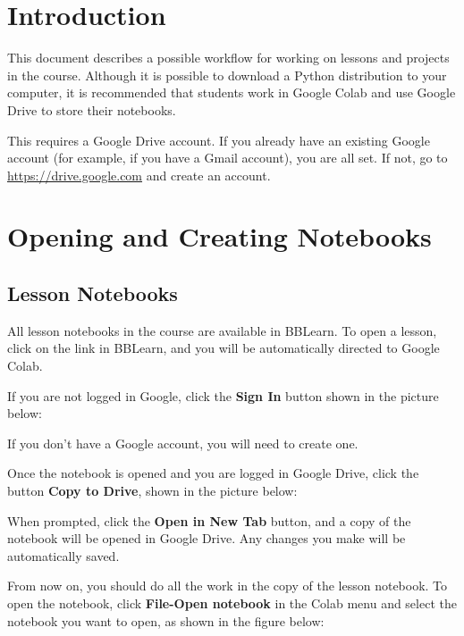 \documentclass[12pt]{article}
\begin{document}
\sffamily

\section{Introduction}

This document describes a possible workflow for working on lessons and projects in the course. Although it is possible to download a Python distribution to your computer, it is recommended that students work in Google Colab and use Google Drive to store their notebooks.

This requires a Google Drive account. If you already have an existing Google account (for example, if you have a Gmail account), you are all set. If not, go to \url{https://drive.google.com} and create an account.

\section{Opening and Creating Notebooks}

\subsection{Lesson Notebooks}

All lesson notebooks in the course are available in BBLearn. To open a lesson, click on the link in BBLearn, and you will be automatically directed to Google Colab.

If you are not logged in Google, click the \textbf{Sign In} button shown in the picture below:


If you don't have a Google account, you will need to create one.

Once the notebook is opened and you are logged in Google Drive, click the button \textbf{Copy to Drive}, shown in the picture below:


When prompted, click the \textbf{Open in New Tab} button, and a copy of the notebook will be opened in Google Drive. Any changes you make will be automatically saved.

From now on, you should do all the work in the copy of the lesson notebook. To open the notebook, click \textbf{File-Open notebook} in the Colab menu and select the notebook you want to open, as shown in the figure below:

\end{document}
